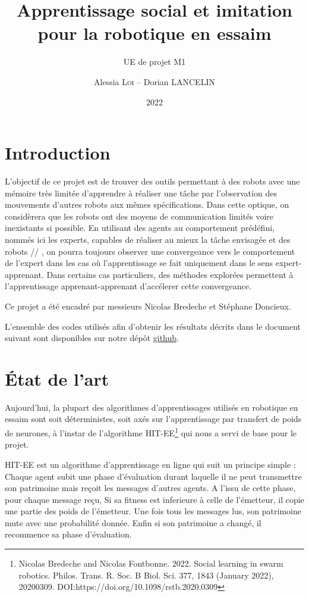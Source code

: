 \documentclass[a4paper, 12pt]{report}
\institute{Sorbonne Université}
\title{Apprentissage social et imitation pour la robotique en essaim}
\subtitle{UE de projet M1}
\author{Alessia \textsc{Loi} -- Dorian \textsc{LANCELIN}}
\date{2022}
\begin{document}
    \maketitle
    \romantableofcontents

    \chapter{Introduction}
	L'objectif de ce projet est de trouver des outils permettant à des robots avec une mémoire très limitée d'apprendre à réaliser une tâche par l'observation des mouvements d'autres robots aux mêmes spécifications.
Dans cette optique, on considèrera que les robots ont des moyens de communication limités voire inexistants si possible.
En utilisant des agents au comportement prédéfini, nommés ici les experts, capables de réaliser au mieux la tâche envisagée et des robots // , on pourra toujours observer une convergeance vers le comportement de l'expert dans les cas où l'apprentissage se fait uniquement dans le sens expert-apprenant.
    Dans certains cas particuliers, des méthodes explorées permettent à l'apprentissage apprenant-apprenant d'accélerer cette convergeance. 
    
    Ce projet a été encadré par messieurs Nicolas Bredeche et Stéphane Doncieux.  
    
    L'ensemble des codes utilisés afin d'obtenir les résultats décrits dans le document suivant sont disponibles sur notre dépôt \href{https://github.com/aerrynn/M1_Projet_ASIRE}{github}. 

    \chapter{État de l'art}
    Aujourd'hui, la plupart des algorithmes d'apprentissages utilisés en robotique en essaim sont soit déterministes, soit axés sur l'apprentissage par transfert de poids de neurones, à l'instar de l'algorithme HIT-EE\footnote{Nicolas Bredeche and Nicolas Fontbonne. 2022. Social learning in swarm robotics. Philos. Trans. R. Soc. B Biol. Sci. 377, 1843 (January 2022), 20200309. DOI:https://doi.org/10.1098/rstb.2020.0309} qui nous a servi de base pour le projet.
    
    HIT-EE est un algorithme d'apprentissage en ligne qui suit un principe simple : Chaque agent subit une phase d'évaluation durant laquelle il ne peut transmettre son patrimoine mais reçoit les messages d'autres agents. A l'issu de cette phase, pour chaque message reçu, Si sa fitness est inferieure à celle de l'émetteur, il copie une partie des poids de l'émetteur. Une fois tous les messages lus, son patrimoine mute avec une probabilité donnée. Enfin si son patrimoine a changé, il recommence sa phase d'évaluation.
    
\end{document}
